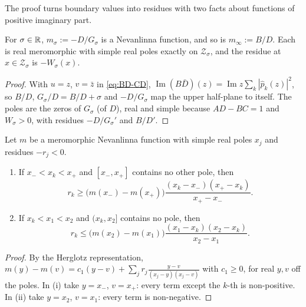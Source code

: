 The proof turns boundary values into residues with two facts about functions of positive
imaginary part.

\begin{lemma}\label{lem:nevfun}
For $\sigma\in\mathbb{R}$, $m_\sigma:=-D/G_\sigma$ is a Nevanlinna function, and so is $m_\infty:=B/D$. Each is real
meromorphic with simple real poles exactly on $\mathcal Z_\sigma$, and the residue at $x\in\mathcal Z_\sigma$ is
$-W_\sigma(x)$.
\end{lemma}

\begin{proof}
With $u=z$, $v=\bar z$ in \eqref{eq:BD-CD}, $\operatorname{Im}(B\bar D)(z)=\operatorname{Im}z\sum_k|\hat p_k(z)|^2$, so
$B/D$, $G_\sigma/D=B/D+\sigma$ and $-D/G_\sigma$ map the upper half-plane to itself. The poles are the
zeros of $G_\sigma$ (of $D$), real and simple because $AD-BC=1$ and $W_\sigma>0$, with residues
$-D/G_\sigma'$ and $B/D'$.
\end{proof}

\begin{lemma}\label{lem:herglotz}
Let $m$ be a meromorphic Nevanlinna function with simple real poles $x_j$ and residues $-r_j<0$.
\begin{enumerate}
\item[(i)] If $x_-<x_k<x_+$ and $[x_-,x_+]$ contains no other pole, then
  \[r_k\ge\bigl(m(x_-)-m(x_+)\bigr)\frac{(x_k-x_-)(x_+-x_k)}{x_+-x_-}.\]
\item[(ii)] If $x_k<x_1<x_2$ and $(x_k,x_2]$ contains no pole, then
  \[r_k\le\bigl(m(x_2)-m(x_1)\bigr)\frac{(x_1-x_k)(x_2-x_k)}{x_2-x_1}.\]
\end{enumerate}
\end{lemma}

\begin{proof}
By the Herglotz representation, $m(y)-m(v)=c_1(y-v)+\sum_jr_j\frac{y-v}{(x_j-y)(x_j-v)}$ with
$c_1\ge0$, for real $y,v$ off the poles. In (i) take $y=x_-$, $v=x_+$: every term except the
$k$-th is non-positive. In (ii) take $y=x_2$, $v=x_1$: every term is non-negative.
\end{proof}

